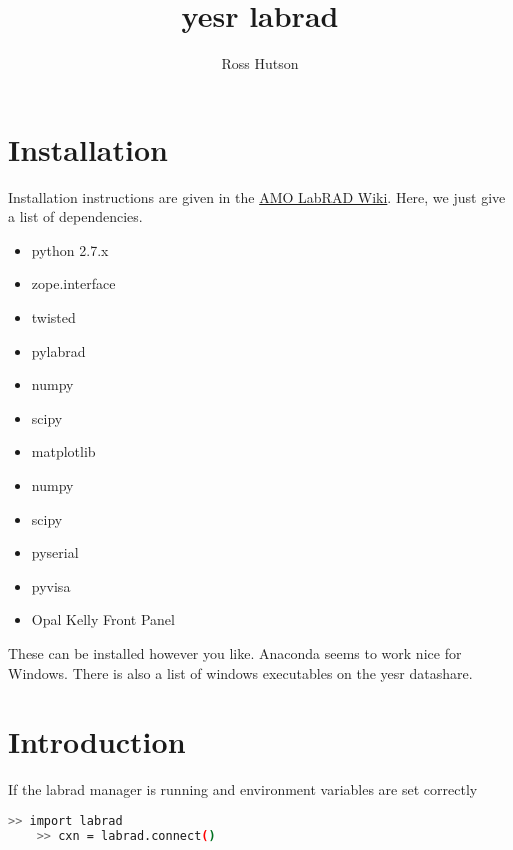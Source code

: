 
\usepackage{listings}
\title{yesr labrad}
\author{Ross Hutson}

\maketitle


\section{Installation}
Installation instructions are given in the \href{https://github.com/AMOLabRAD/AMOLabRAD/wiki/Installation-instructions}{AMO LabRAD Wiki}. 
Here, we just give a list of dependencies. 
\begin{itemize}
    \item python 2.7.x
    \item zope.interface
    \item twisted
    \item pylabrad
    \item numpy 
    \item scipy
    \item matplotlib
    \item numpy 
    \item scipy
    \item pyserial
    \item pyvisa
    \item Opal Kelly Front Panel
\end{itemize}
These can be installed however you like. Anaconda seems to work nice for Windows. There is also a list of windows executables on the yesr datashare.

\section{Introduction}
If the labrad manager is running and environment variables are set correctly
\begin{lstlisting}[language=bash]
    >> import labrad
    >> cxn = labrad.connect()
\end{lstlisting}



